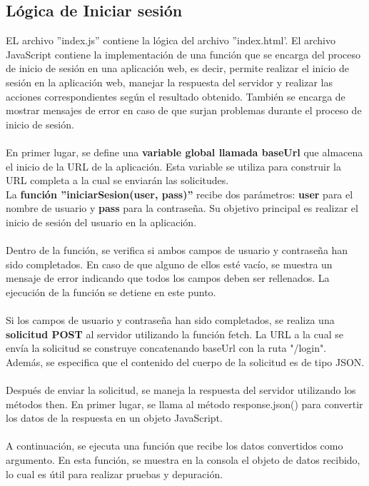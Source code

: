 \documentclass[12pt]{report}
\begin{document}
\subsection{Lógica de Iniciar sesión}
EL archivo ''index.js'' contiene la lógica del archivo ''index.html'. El archivo JavaScript contiene la implementación de una función que se encarga del proceso de inicio de sesión en una aplicación web, es decir, permite realizar el inicio de sesión en la aplicación web, manejar la respuesta del servidor y realizar las acciones correspondientes según el resultado obtenido. También se encarga de mostrar mensajes de error en caso de que surjan problemas durante el proceso de inicio de sesión.
\\\\
En primer lugar, se define una \textbf{variable global llamada baseUrl} que almacena el inicio de la URL de la aplicación. Esta variable se utiliza para construir la URL completa a la cual se enviarán las solicitudes.
\\
La \textbf{función ''iniciarSesion(user, pass)''} recibe dos parámetros: \textbf{user} para el nombre de usuario y \textbf{pass} para la contraseña. Su objetivo principal es realizar el inicio de sesión del usuario en la aplicación.
\\\\
Dentro de la función, se verifica si ambos campos de usuario y contraseña han sido completados. En caso de que alguno de ellos esté vacío, se muestra un mensaje de error indicando que todos los campos deben ser rellenados. La ejecución de la función se detiene en este punto.
\\\\
Si los campos de usuario y contraseña han sido completados, se realiza una \textbf{solicitud POST} al servidor utilizando la función fetch. La URL a la cual se envía la solicitud se construye concatenando baseUrl con la ruta "/login". Además, se especifica que el contenido del cuerpo de la solicitud es de tipo JSON.
\\\\
Después de enviar la solicitud, se maneja la respuesta del servidor utilizando los métodos then. En primer lugar, se llama al método response.json() para convertir los datos de la respuesta en un objeto JavaScript.
\\\\
A continuación, se ejecuta una función que recibe los datos convertidos como argumento. En esta función, se muestra en la consola el objeto de datos recibido, lo cual es útil para realizar pruebas y depuración.
\end{document}
